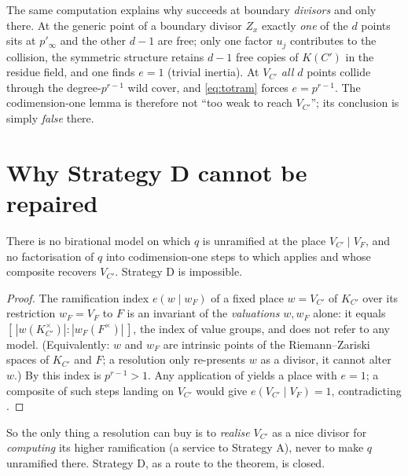 \documentclass[11pt]{article}
\begin{document}
\begin{rem*}
The same computation explains why 
succeeds at boundary \emph{divisors} and only there. At the generic point of a
boundary divisor $Z_x$ exactly \emph{one} of the $d$ points sits at
$p'_\infty$ and the other $d-1$ are free; only one factor $u_j$ contributes to
the collision, the symmetric structure retains $d-1$ free copies of $K(C')$ in
the residue field, and one finds $e=1$ (trivial inertia). At $V_{C'}$
\emph{all $d$} points collide through the degree-$p^{r-1}$ wild cover, and
\cref{eq:totram} forces $e=p^{r-1}$. The codimension-one lemma is therefore not
``too weak to reach $V_{C'}$''; its conclusion is simply \emph{false} there.
\end{rem*}

\section{Why Strategy D cannot be repaired}\label{sec:Ddead}

\begin{cor}\label{cor:Ddead}
There is no birational model on which $q$ is unramified at the place
$V_{C'}\mid V_F$, and no factorisation of $q$ into codimension-one steps to which
 applies and whose composite recovers
$V_{C'}$. Strategy D is impossible.
\end{cor}

\begin{proof}
The ramification index $e(w\mid w_F)$ of a fixed place $w=V_{C'}$ of $K_{C'}$
over its restriction $w_F=V_F$ to $F$ is an invariant of the \emph{valuations}
$w,w_F$ alone: it equals $[\,|w(K_{C'}^\times)| : |w_F(F^\times)|\,]$, the index
of value groups, and does not refer to any model. (Equivalently: $w$ and $w_F$
are intrinsic points of the Riemann--Zariski spaces of $K_{C'}$ and $F$; a
resolution only re-presents $w$ as a divisor, it cannot alter $w$.) By
 this index is $p^{r-1}>1$. Any application of
 yields a place with $e=1$; a
composite of such steps landing on $V_{C'}$ would give $e(V_{C'}\mid V_F)=1$,
contradicting .
\end{proof}

\noindent So the only thing a resolution can buy is to \emph{realise} $V_{C'}$
as a nice divisor for \emph{computing} its higher ramification (a service to
Strategy A), never to make $q$ unramified there. Strategy D, as a route to the
theorem, is closed.
\end{document}
